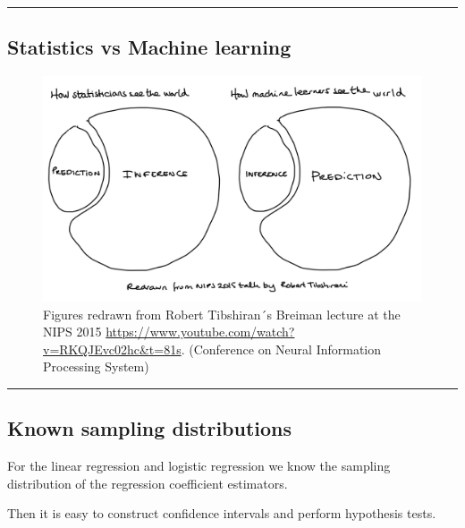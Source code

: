 \documentclass[
  letterpaper,
  DIV=11,
  numbers=noendperiod]{scrartcl}
\begin{document}
\begin{center}\rule{0.5\linewidth}{0.5pt}\end{center}

\hypertarget{statistics-vs-machine-learning}{%
\subsection{Statistics vs Machine
learning}\label{statistics-vs-machine-learning}}

\begin{figure}

{\centering \includegraphics[width=1\textwidth,height=\textheight]{./StatsvsMLPredInf.jpg}

}

\caption{Figures redrawn from Robert Tibshiran´s Breiman lecture at the
NIPS 2015 \url{https://www.youtube.com/watch?v=RKQJEvc02hc\&t=81s}.
(Conference on Neural Information Processing System)}

\end{figure}

\begin{center}\rule{0.5\linewidth}{0.5pt}\end{center}

\hypertarget{known-sampling-distributions}{%
\subsection{Known sampling
distributions}\label{known-sampling-distributions}}

For the linear regression and logistic regression we know the sampling
distribution of the regression coefficient estimators.

Then it is easy to construct confidence intervals and perform hypothesis
tests.
\end{document}
